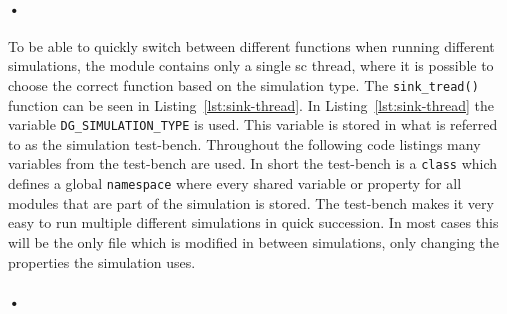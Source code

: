 \documentclass[a4paper, 12pt]{report}
\newcommand{\codeword}[1]{\texttt{#1}}
\begin{document}
\paragraph{•} 
To be able to quickly switch between different functions when running different simulations, the module contains only a single \gls{sc} thread, where it is possible to choose the correct function based on the simulation type.
The \codeword{sink\_tread()} function can be seen in Listing~\ref{lst:sink-thread}.
In Listing~\ref{lst:sink-thread} the variable \codeword{DG\_SIMULATION\_TYPE} is used.
This variable is stored in what is referred to as the simulation test-bench.
Throughout the following code listings many variables from the test-bench are used.
In short the test-bench is a \codeword{class} which defines a global \codeword{namespace} where every shared variable or property for all modules that are part of the simulation is stored.
The test-bench makes it very easy to run multiple different simulations in quick succession.
In most cases this will be the only file which is modified in between simulations, only changing the properties the simulation uses.

\paragraph{•}
\begin{minipage}{\linewidth}

\end{minipage}
\end{document}
